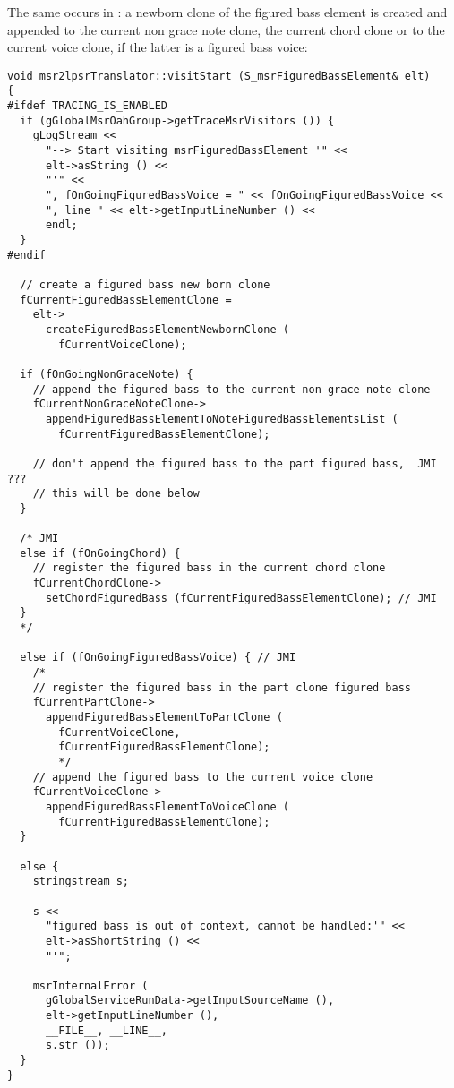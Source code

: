 The same occurs in : a newborn clone of the figured bass element is created and appended to the current non grace note clone, the current chord clone or to the current voice clone, if the latter is a figured bass voice: %
\begin{lstlisting}[language=CPlusPlus]
void msr2lpsrTranslator::visitStart (S_msrFiguredBassElement& elt)
{
#ifdef TRACING_IS_ENABLED
  if (gGlobalMsrOahGroup->getTraceMsrVisitors ()) {
    gLogStream <<
      "--> Start visiting msrFiguredBassElement '" <<
      elt->asString () <<
      "'" <<
      ", fOnGoingFiguredBassVoice = " << fOnGoingFiguredBassVoice <<
      ", line " << elt->getInputLineNumber () <<
      endl;
  }
#endif

  // create a figured bass new born clone
  fCurrentFiguredBassElementClone =
    elt->
      createFiguredBassElementNewbornClone (
        fCurrentVoiceClone);

  if (fOnGoingNonGraceNote) {
    // append the figured bass to the current non-grace note clone
    fCurrentNonGraceNoteClone->
      appendFiguredBassElementToNoteFiguredBassElementsList (
      	fCurrentFiguredBassElementClone);

    // don't append the figured bass to the part figured bass,  JMI ???
    // this will be done below
  }

  /* JMI
  else if (fOnGoingChord) {
    // register the figured bass in the current chord clone
    fCurrentChordClone->
      setChordFiguredBass (fCurrentFiguredBassElementClone); // JMI
  }
  */

  else if (fOnGoingFiguredBassVoice) { // JMI
    /*
    // register the figured bass in the part clone figured bass
    fCurrentPartClone->
      appendFiguredBassElementToPartClone (
        fCurrentVoiceClone,
        fCurrentFiguredBassElementClone);
        */
    // append the figured bass to the current voice clone
    fCurrentVoiceClone->
      appendFiguredBassElementToVoiceClone (
        fCurrentFiguredBassElementClone);
  }

  else {
    stringstream s;

    s <<
      "figured bass is out of context, cannot be handled:'" <<
      elt->asShortString () <<
      "'";

    msrInternalError (
      gGlobalServiceRunData->getInputSourceName (),
      elt->getInputLineNumber (),
      __FILE__, __LINE__,
      s.str ());
  }
}
\end{lstlisting}

